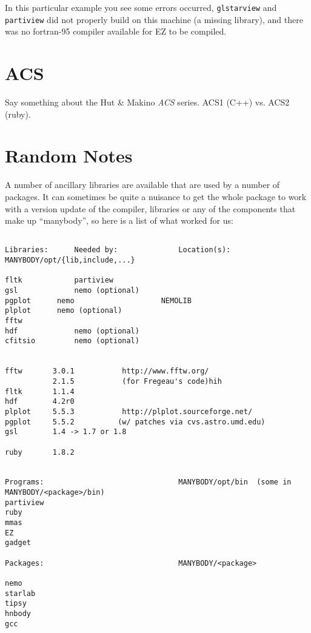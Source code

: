 In this particular example you see some errors occurred, {\tt glstarview} and
{\tt partiview} did not
properly build on this machine (a missing library), and there was no fortran-95
compiler available for EZ to be compiled.

\section{ACS}

Say something about the Hut \& Makino {\it ACS} series. ACS1 (C++) vs. ACS2 (ruby).

\section{Random Notes}

A number of ancillary libraries are available that are used by a number
of packages. It can sometimes be quite a nuisance to get the whole package
to work with a version update of the compiler, libraries or any of the
components that make up ``manybody'', so here is a list of what worked
for us:

\footnotesize\begin{verbatim}

Libraries:      Needed by:              Location(s): MANYBODY/opt/{lib,include,...}

fltk            partiview
gsl             nemo (optional)
pgplot		nemo                    NEMOLIB
plplot		nemo (optional)
fftw            
hdf             nemo (optional)
cfitsio         nemo (optional)


fftw       3.0.1           http://www.fftw.org/ 
           2.1.5           (for Fregeau's code)hih
fltk	   1.1.4
hdf        4.2r0
plplot     5.5.3           http://plplot.sourceforge.net/   
pgplot     5.5.2          (w/ patches via cvs.astro.umd.edu)
gsl        1.4 -> 1.7 or 1.8

ruby	   1.8.2


Programs:                               MANYBODY/opt/bin  (some in MANYBODY/<package>/bin)
partiview
ruby
mmas
EZ
gadget

Packages:                               MANYBODY/<package>

nemo
starlab
tipsy
hnbody
gcc


\end{verbatim}\normalsize



